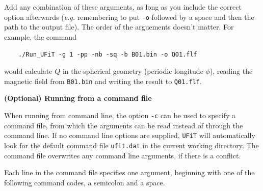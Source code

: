 \documentclass[12pt,twoside]{article}
\begin{document}
\vspace{2mm}

Add any combination of these arguments, as long as you include the correct option afterwards (\textit{e.g.} remembering to put \texttt{-o} followed by a space and then the path to the output file). The order of the arguements doesn't matter. For example, the command

$\quad\quad$\texttt{./Run\_UFiT -g 1 -pp -nb -sq -b B01.bin -o Q01.flf}

would calculate $Q$ in the spherical geometry (periodic longitude $\phi$), reading the magnetic field from \texttt{B01.bin} and writing the result to \texttt{Q01.flf}.


\vspace{2mm}
{\Large \textbf{(Optional) Running from a command file}}

When running from command line, the option \texttt{-c} can be used to specify a command file, from which the arguments can be read instead of through the command line. If no command line options are supplied, \texttt{UFiT} will automatically look for the default command file \texttt{ufit.dat} in the current working directory. The command file overwrites any command line arguments, if there is a conflict.

Each line in the command file specifies one argument, beginning with one of the following command codes, a semicolon and a space.
\end{document}
